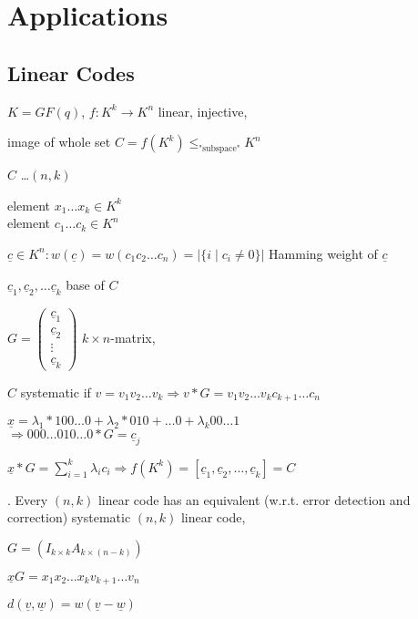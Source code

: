 
\section{Applications}
\subsection{Linear Codes}
\begin{definition}
  $K = GF(q)$, $f:K^k \rightarrow K^n$ linear, injective,

  image of whole set $C = f(K^k) \leq_{\text{"subspace"}} K^n$

  $C$ \ldots $(n,k)$ 

  element $x_1\ldots x_k \in K^k$\\
  element $c_1\ldots c_k \in K^n$

  $\underline{c} \in K^n: w(\underline{c}) = w(c_1c_2 \ldots c_n) = |\{i \mid c_i \neq 0 \}|$ Hamming weight of $\underline{c}$

  $\underline{c}_1, \underline{c}_2, \ldots \underline{c}_k$ base of $C$

$G = \begin{pmatrix}\underline{c}_1\\ \underline{c}_2\\ \vdots \\ \underline{c}_k \end{pmatrix}$ $k\times n$-matrix, 

  $C$ systematic if $v = v_1v_2 \ldots v_k \Rightarrow v*G = v_1v_2 \ldots v_kc_{k+1}\ldots c_n$

  $\underline{x} = \lambda_1 * 100 \ldots 0 + \lambda_2 * 010 + \ldots 0 + \lambda_k 00\ldots 1$ \\
  $\Rightarrow 000\ldots 010 \ldots 0 * G = \underline{c}_j$

  $\underline{x}*G = \sum_{i=1}^k \lambda_i c_i \Rightarrow f(K^k) = [\underline{c}_1, \underline{c}_2, \ldots, \underline{c}_k ] = C$
\end{definition}

\Theorem.
Every $(n,k)$ linear code has an equivalent (w.r.t. error detection and correction) systematic $(n,k)$ linear code,

$G = (I_{k\times k} A_{k\times (n-k)})$

$\underline{x} G = x_1 x_2 \ldots x_k v_{k+1} \ldots v_n$

$d(\underline{v}, \underline{w}) = w(\underline{v}-\underline{w})$

